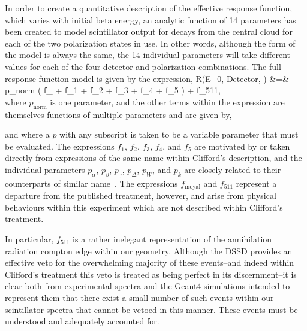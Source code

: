 In order to create a quantitative description of the effective response function, which varies with initial beta energy, an analytic function of 14 parameters  has been created to model scintillator output for decays from the central cloud for each of the two polarization states in use.  In other words, although the form of the model is always the same, the 14 individual parameters will take different values for each of the four detector and polarization combinations.  The full response function model is given by the expression,
\bea
	R(E_{0}, \textrm{Detector}, ) &=& p_{\textrm{norm}} \left( f_{} + f_1 + f_2 + f_3 + f_4 + f_5 \right) + f_{511},
	\nonumber \\
	\label{eq:fullresponsefunction}
\eea
where $p_{\textrm{norm}}$ is one parameter, and the other terms within the expression are themselves functions of multiple parameters and are given by,




 and
where a $p$ with any subscript is taken to be a variable parameter that must be evaluated.  The expressions $f_1$, $f_2$, $f_3$, $f_4$, and $f_5$ are motivated by or taken directly from expressions of the same name within Clifford's description, and the individual parameters $p_\alpha$, $p_\beta$, $p_\gamma$, $p_\Delta$, $p_W$, and $p_k$ are closely related to their counterparts of similar name~\cite{clifford}.  The expressions $f_{\mathrm{moyal}}$ and $f_{511}$ represent a departure from the published treatment, however, and arise from physical behaviours within this experiment which are not described within Clifford's treatment.

In particular, $f_{511}$ is a rather inelegant representation of the annihilation radiation compton edge within our geometry.  Although the DSSD provides an effective veto for the overwhelming majority of these events--and indeed within Clifford's treatment this veto is treated as being perfect in its discernment--it is clear both from experimental spectra and the Geant4 simulations intended to represent them that there exist a small number of such events within our scintillator spectra that cannot be vetoed in this manner.  These events must be understood and adequately accounted for.  

